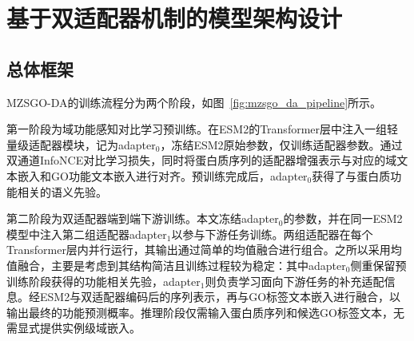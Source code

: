 \section{基于双适配器机制的模型架构设计}

\subsection{总体框架}

MZSGO-DA的训练流程分为两个阶段，如图~\ref{fig:mzsgo_da_pipeline}所示。

第一阶段为域功能感知对比学习预训练。在ESM2的Transformer层中注入一组轻量级适配器模块，记为adapter$_0$，冻结ESM2原始参数，仅训练适配器参数。通过双通道InfoNCE对比学习损失，同时将蛋白质序列的适配器增强表示与对应的域文本嵌入和GO功能文本嵌入进行对齐。预训练完成后，adapter$_0$获得了与蛋白质功能相关的语义先验。

第二阶段为双适配器端到端下游训练。本文冻结adapter$_0$的参数，并在同一ESM2模型中注入第二组适配器adapter$_1$以参与下游任务训练。两组适配器在每个Transformer层内并行运行，其输出通过简单的均值融合进行组合。之所以采用均值融合，主要是考虑到其结构简洁且训练过程较为稳定：其中adapter$_0$侧重保留预训练阶段获得的功能相关先验，adapter$_1$则负责学习面向下游任务的补充适配信息。经ESM2与双适配器编码后的序列表示，再与GO标签文本嵌入进行融合，以输出最终的功能预测概率。推理阶段仅需输入蛋白质序列和候选GO标签文本，无需显式提供实例级域嵌入。

